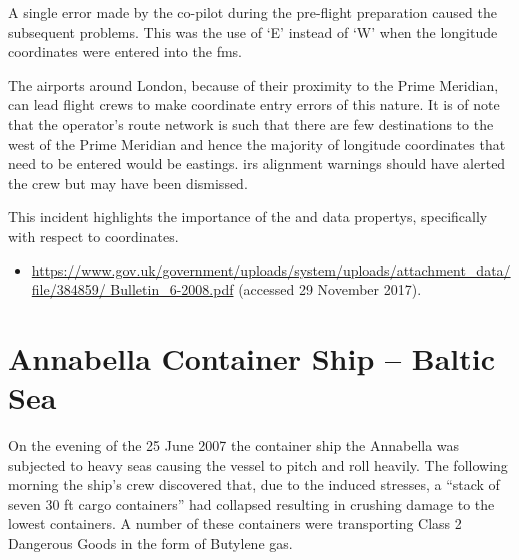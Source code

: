 A single error made by the co-pilot during the pre-flight preparation caused the subsequent problems. This was the use of `E' instead of `W' when the longitude coordinates were entered into the \gls{fms}.

The airports around London, because of their proximity to the Prime Meridian, can lead flight crews to make coordinate entry errors of this nature. It is of note that the operator's route network is such that there are few destinations to the west of the Prime Meridian and hence the majority of longitude coordinates that need to be entered would be eastings. \gls{irs} alignment warnings should have alerted the crew but may have been dismissed.

This incident highlights the importance of the  and  \glspl{data property}, specifically with respect to coordinates.

\begin{samepage}
\begin{itemize}
  \item \raggedright{\href{https://www.gov.uk/government/uploads/system/uploads/attachment_data/file/384859/Bulletin_6-2008.pdf}{https://www.gov.uk/government/uploads/system/uploads/attachment\_data/file/384859/ Bulletin\_6-2008.pdf} (accessed 29 November 2017).}
\end{itemize}
\end{samepage}

\section{Annabella Container Ship -- Baltic Sea} \label{bkm:incacc:annabella}
On the evening of the 25 June 2007 the container ship the Annabella was subjected to heavy seas causing the vessel to pitch and roll heavily. The following morning the ship’s crew discovered that, due to the induced stresses, a ``stack of seven 30 ft cargo containers'' had collapsed resulting in crushing damage to the lowest containers. A number of these containers were transporting Class 2 Dangerous Goods in the form of Butylene gas.
 
